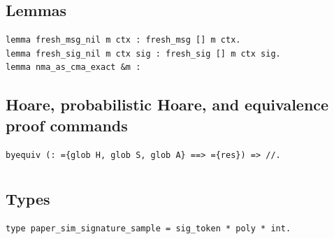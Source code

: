 \subsection*{Lemmas}
\begin{lstlisting}[language=EasyCrypt,basicstyle=\ttfamily\tiny]
lemma fresh_msg_nil m ctx : fresh_msg [] m ctx.
lemma fresh_sig_nil m ctx sig : fresh_sig [] m ctx sig.
lemma nma_as_cma_exact &m :
\end{lstlisting}

\subsection*{Hoare, probabilistic Hoare, and equivalence proof commands}
\begin{lstlisting}[language=EasyCrypt,basicstyle=\ttfamily\tiny]
byequiv (: ={glob H, glob S, glob A} ==> ={res}) => //.
\end{lstlisting}

\section*{}

\subsection*{Types}
\begin{lstlisting}[language=EasyCrypt,basicstyle=\ttfamily\tiny]
type paper_sim_signature_sample = sig_token * poly * int.
\end{lstlisting}

